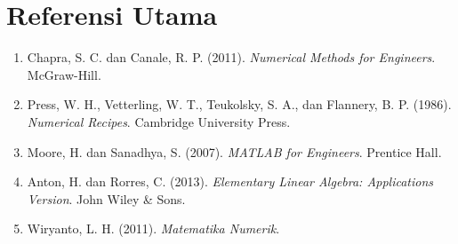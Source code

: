 \documentclass[book,english,noindex,lean,nobackpage,nocopyright,noupdate,nofiglist,notablist]{enacom}
\begin{document}
\chapter*{Referensi Utama}
\begin{enumerate}
\item Chapra, S. C. dan Canale, R. P. (2011). \textit{Numerical Methods for Engineers}. McGraw-Hill.
\item Press, W. H., Vetterling, W. T., Teukolsky, S. A., dan Flannery, B. P. (1986). \textit{Numerical Recipes}. Cambridge University Press.
\item Moore, H. dan Sanadhya, S. (2007). \textit{MATLAB for Engineers}. Prentice Hall.
\item Anton, H. dan Rorres, C. (2013). \textit{Elementary Linear Algebra: Applications Version}. John Wiley \& Sons.
\item Wiryanto, L. H. (2011). \textit{Matematika Numerik}.
\end{enumerate}
\end{document}
